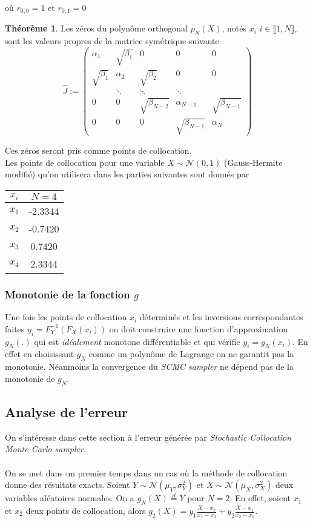 \documentclass[a4paper,12pt]{report}
\numberwithin{equation}{section}
\theoremstyle{definition}
\newtheorem{theorem}{Théorème}[subsection]
\numberwithin{equation}{section}
\begin{document}
où $r_{0,0}=1$ et $r_{0,1}=0$
\begin{theorem}
\label{th1}
Les zéros du polynôme orthogonal $p_{N}(X)$, notés  $x_{i}$ $i\in\llbracket1,N\rrbracket$, sont les valeurs propres de la matrice symétrique suivante
$$\hat{J}:=
\begin{pmatrix}
\alpha_{1} & \sqrt{\beta_{1}} & 0 & 0 & 0\\
\sqrt{\beta_{1}} & \alpha_{2} & \sqrt{\beta_{2}} & 0 & 0\\
 & \ddots  &\ddots &\ddots &\\
 0 & 0 & \sqrt{\beta_{N-2}} & \alpha_{N-1} & \sqrt{\beta_{N-1}}\\
 0 & 0 & 0 & \sqrt{\beta_{N-1}} & \alpha_{N} 
\end{pmatrix}$$
\end{theorem}
Ces zéros seront pris comme points de collocation.\\
\vspace*{0.3cm}
Les points de collocation pour une variable $X\sim\mathcal{N}(0,1)$ (Gauss-Hermite modifié) qu'on utilisera dans les parties suivantes sont donnés par 
\begin{center}
\begin{tabular}{|c|c|}
\hline
$x_{i}$ &  $N=4$\\
\hline
$x_{1}$ &  -2.3344 \\
\hline
$x_{2}$ &  -0.7420 \\
\hline
$x_{3}$ &  0.7420 \\
\hline
$x_{4}$ &2.3344 \\
\hline
\end{tabular}
\end{center}
\subsubsection{Monotonie de la fonction $g$}
Une fois les points de collocation $x_{i}$ déterminés et les inversions correspondantes faites $y_{i}=F_{Y}^{-1}(F_{X}(x_{i}))$ on doit construire une fonction d'approximation $g_{N}(.)$ qui est \textit{idéalement} monotone différentiable et qui vérifie $y_{i}=g_{N}(x_{i})$. En effet en choisissant $g_{N}$ comme un polynôme de Lagrange on ne garantit pas la monotonie. Néanmoins la convergence du \textit{SCMC sampler} ne dépend pas de la monotonie de $g_{N}$.
\subsection{Analyse de l'erreur}
On s'intéresse dans cette section à l'erreur générée par \textit{Stochastic Collocation Monte Carlo sampler}.
\\\\
On se met dans un premier temps dans un cas où la méthode de collocation donne des résultats exacts. Soient $Y\sim\mathcal{N}(\mu_{Y},\sigma_{Y}^{2})$ et $X\sim\mathcal{N}(\mu_{X},\sigma_{X}^{2})$ deux variables aléatoires normales. On a  $g_{N}(X)\overset{d}{=}Y$ pour $N=2$. En effet, soient $x_{1}$ et $x_{2}$ deux points de collocation, alors $g_{2}(X)=y_{1}\frac{X-x_{2}}{x_{1}-x_{2}}+y_{2}\frac{X-x_{1}}{x_{2}-x_{1}}$.
\\
\end{document}
